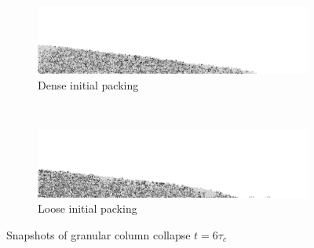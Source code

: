 \begin{figure}[tbhp]
\centering
\begin{subfigure}[b]{\textwidth}
\centering
\includegraphics[width=\textwidth]{dense_a08_r6_final}
\caption{Dense initial packing}
\label{fig:dense_a08_r6_final}
\end{subfigure}
\\
\begin{subfigure}[b]{\textwidth}
\centering
\includegraphics[width=\textwidth]{loose_a08_r6_final}
\caption{Loose initial packing}
\label{fig:loose_a08_r6_final}
\end{subfigure}
\caption{Snapshots of granular column collapse $t = 6 \tau_c$}
\label{fig:density_r6}
\end{figure}


